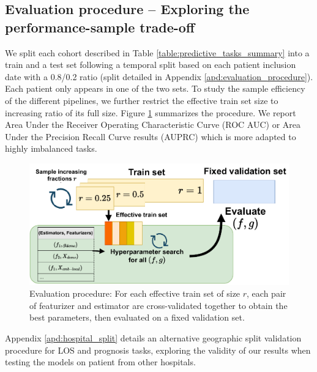 \documentclass[french,12pt,twoside,a4paper]{book}
\begin{document}
\subsection{Evaluation procedure -- Exploring the performance-sample trade-off}%
\label{subsec:predictive_models:evaluation_pipeline}

We split each cohort described in Table \ref{table:predictive_tasks_summary}
into a train and a test set following a temporal split based on each patient
inclusion date with a 0.8/0.2 ratio (split detailed in Appendix
\ref{apd:evaluation_procedure}). Each patient only appears in one of the two
sets. To study the sample efficiency of the different pipelines, we further
restrict the effective train set size to increasing ratio of its full size.
Figure \ref{fig:evaluation_procedure} summarizes the procedure. We report Area
Under the Receiver Operating Characteristic Curve (ROC AUC) or Area Under the
Precision Recall Curve results (AUPRC) which is more adapted to highly
imbalanced tasks.

\begin{figure}[!h]
  \centering
  \includegraphics[width=0.8\linewidth]{img/chapter_3/selection_procedure.pdf}
  \caption{Evaluation procedure: For
    each effective train set of size $r$, each pair of featurizer and estimator
    are cross-validated together to obtain the best parameters, then evaluated
    on a fixed validation set.}\label{fig:evaluation_procedure}
\end{figure}

Appendix \ref{apd:hospital_split} details an alternative geographic split
validation procedure for LOS and prognosis tasks, exploring the validity of our
results when testing the models on patient from other hospitals.
\end{document}

